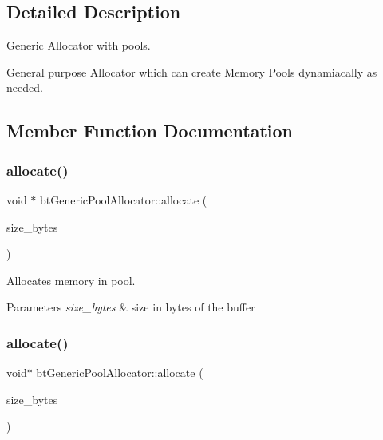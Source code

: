 \subsection{Detailed Description}
Generic Allocator with pools. 

General purpose Allocator which can create Memory Pools dynamiacally as needed. 

\subsection{Member Function Documentation}
\mbox{\label{classbtGenericPoolAllocator_ae07307fd61ffa9ce47b5f198b87d17e1}} 
\subsubsection{\texorpdfstring{allocate()}{allocate()}\hspace{0.1cm}{\footnotesize\ttfamily [1/2]}}
{\footnotesize\ttfamily void $\ast$ bt\+Generic\+Pool\+Allocator\+::allocate (\begin{DoxyParamCaption}\item[{size\+\_\+t}]{size\+\_\+bytes }\end{DoxyParamCaption})}



Allocates memory in pool. 


\begin{DoxyParams}{Parameters}
{\em size\+\_\+bytes} & size in bytes of the buffer \\
\hline
\end{DoxyParams}
\mbox{\label{classbtGenericPoolAllocator_a621df0fb459af951d8a2eeda361a8691}} 
\subsubsection{\texorpdfstring{allocate()}{allocate()}\hspace{0.1cm}{\footnotesize\ttfamily [2/2]}}
{\footnotesize\ttfamily void$\ast$ bt\+Generic\+Pool\+Allocator\+::allocate (\begin{DoxyParamCaption}\item[{size\+\_\+t}]{size\+\_\+bytes }\end{DoxyParamCaption})}



